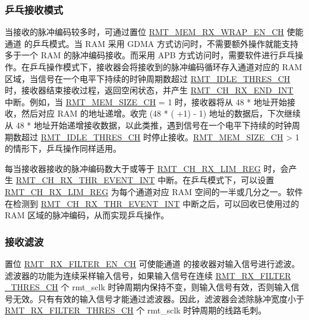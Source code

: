 \documentclass[main\_\_CN.tex]{subfiles}
\begin{document}
\subsubsection{乒乓接收模式}

当接收的脉冲编码较多时，可通过置位 \hyperref[fielddesc:RMTMEMRXWRAPENCHM]{RMT\_MEM\_RX\_WRAP\_EN\_CH} 使能通道  的乒乓模式。当 RAM 采用 GDMA 方式访问时，不需要额外操作就能支持多于一个 RAM 的脉冲编码接收。而采用 APB 方式访问时，需要软件进行乒乓操作。在乒乓操作模式下，接收器会将接收到的脉冲编码循环存入通道对应的 RAM 区域，当信号在一个电平下持续的时钟周期数超过 \hyperref[fielddesc:RMTIDLETHRESCHM]{RMT\_IDLE\_THRES\_CH} 时，接收器结束接收过程，返回空闲状态，并产生 \hyperref[int:RMTCHMRXENDINT]{RMT\_CH\_RX\_END\_INT} 中断。例如，当 \hyperref[fielddesc:RMTMEMSIZECHM]{RMT\_MEM\_SIZE\_CH} = 1 时，接收器将从 48 *  地址开始接收，然后对应 RAM 的地址递增。收完 (48 * ( +1) - 1) 地址的数据后，下次继续从 48 *  地址开始递增接收数据，以此类推，遇到信号在一个电平下持续的时钟周期数超过 \hyperref[fielddesc:RMTIDLETHRESCHM]{RMT\_IDLE\_THRES\_CH} 时停止接收。\hyperref[fielddesc:RMTMEMSIZECHM]{RMT\_MEM\_SIZE\_CH} > 1 的情形下，乒乓操作同样适用。

每当接收器接收的脉冲编码数大于或等于 \hyperref[fielddesc:RMTCHMRXLIMREG]{RMT\_CH\_RX\_LIM\_REG} 时，会产生
\hyperref[int:RMTCHMRXTHREVENTINT]{RMT\_CH\_RX\_THR\_EVENT\_INT} 中断。在乒乓模式下，可以设置 \hyperref[fielddesc:RMTCHMRXLIMREG]{RMT\_CH\_RX\_LIM\_REG}
为每个通道对应 RAM 空间的一半或几分之一。软件在检测到 \hyperref[int:RMTCHMRXTHREVENTINT]{RMT\_CH\_RX\_THR\_EVENT\_INT}
中断之后，可以回收已使用过的 RAM 区域的脉冲编码，从而实现乒乓操作。


\subsubsection{接收滤波}

置位 \hyperref[fielddesc:RMTRXFILTERENCHM]{RMT\_RX\_FILTER\_EN\_CH} 可使能通道  的接收器对输入信号进行滤波。滤波器的功能为连续采样输入信号，如果输入信号在连续 \hyperref[fielddesc:RMTRXFILTERTHRESCHM]{RMT\_RX\_FILTER \_THRES\_CH} 个 rmt\_sclk 时钟周期内保持不变，则输入信号有效，否则输入信号无效。只有有效的输入信号才能通过滤波器。因此，滤波器会滤除脉冲宽度小于 \hyperref[fielddesc:RMTRXFILTERTHRESCHM]{RMT\_RX\_FILTER\_THRES\_CH} 个 rmt\_sclk 时钟周期的线路毛刺。
\end{document}
